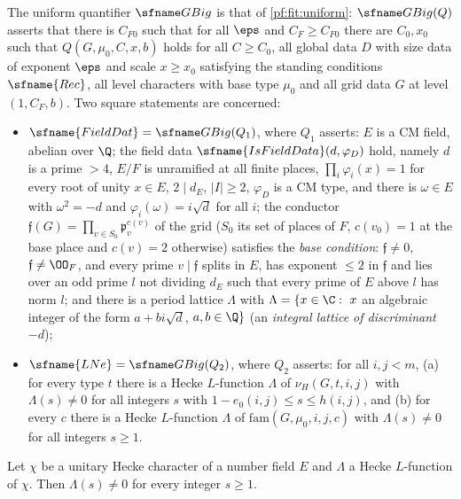 The uniform quantifier $\shdivGBig$ is that of \cref{pf:fit:uniform}: $\shdivGBig(Q)$ asserts that there is $C_{F0}$ such that for
all $\eps$ and $C_F\ge C_{F0}$ there are $C_0,x_0$ such that $Q(G,\mu_0,C,x,b)$ holds for all $C\ge C_0$, all global data $D$ with
size data of exponent $\eps$ and scale $x\ge x_0$ satisfying the standing conditions $\sfname{Rec}$, all level characters with base
type $\mu_0$ and all grid data $G$ at level $(1,C_F,b)$. Two square statements are concerned:
\begin{itemize}
\item $\sfname{FieldDat}=\shdivGBig(Q_1)$, where $Q_1$ asserts: $E$ is a CM field, abelian over $\Q$; the field data
$\sfname{IsFieldData}(d,\varphi_D)$ hold, namely $d$ is a prime $>4$, $E/F$ is unramified at all finite places, $\prod_i\varphi_i(x)=1$
for every root of unity $x\in E$, $2\mid d_E$, $|I|\ge2$, $\varphi_D$ is a CM type, and there is $\omega\in E$ with $\omega^2=-d$ and
$\varphi_i(\omega)=i\sqrt d$ for all $i$; the conductor $\mathfrak f(G)=\prod_{v\in S_0}\mathfrak p_v^{c(v)}$ of the grid ($S_0$ its
set of places of $F$, $c(v_0)=1$ at the base place and $c(v)=2$ otherwise) satisfies the \emph{base condition}: $\mathfrak f\ne0$,
$\mathfrak f\ne\OO_F$, and every prime $v\mid\mathfrak f$ splits in $E$, has exponent $\le2$ in $\mathfrak f$ and lies over an odd
prime $l$ not dividing $d_E$ such that every prime of $E$ above $l$ has norm $l$; and there is a period lattice $\Lambda$ with
$\Lambda=\{x\in\C:\ x$ an algebraic integer of the form $a+bi\sqrt d$, $a,b\in\Q\}$ (an \emph{integral lattice of discriminant $-d$});
\item $\sfname{LNe}=\shdivGBig(Q_2)$, where $Q_2$ asserts: for all $i,j<m$, (a) for every type $t$ there is a Hecke
$L$-function $\Lambda$ of $\nu_H(G,t,i,j)$ with $\Lambda(s)\ne0$ for all integers $s$ with $1-e_0(i,j)\le s\le h(i,j)$, and (b) for
every $c$ there is a Hecke $L$-function $\Lambda$ of $\mathrm{fam}(G,\mu_0,i,j,c)$ with $\Lambda(s)\ne0$ for all integers $s\ge1$.
\end{itemize}

\begin{lemma}[Non-vanishing at $s=1$ and in the half plane of absolute convergence]\label{pf:sh-div:lone}
Let $\chi$ be a unitary Hecke character of a number field $E$ and $\Lambda$ a Hecke $L$-function of $\chi$. Then $\Lambda(s)\ne0$ for
every integer $s\ge1$.
\end{lemma}


